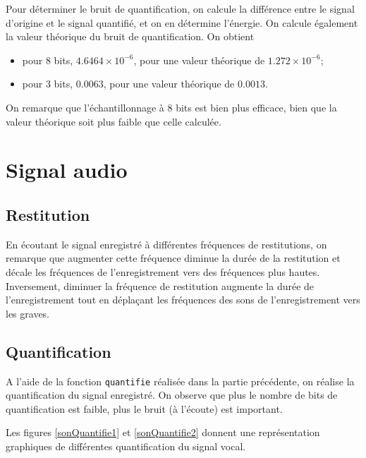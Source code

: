 \documentclass[french]{article}
\begin{document}

Pour déterminer le bruit de quantification, on calcule la différence entre le signal d'origine et le signal quantifié, et on en détermine l'énergie. On calcule également la valeur théorique du bruit de quantification. On obtient

\begin{itemize}
	\item pour 8 bits, $4.6464 \times 10^{-6}$, pour une valeur théorique de $1.272 \times 10^{-6}$;
	\item pour 3 bits, $0.0063$, pour une valeur théorique de $0.0013$.
\end{itemize}
On remarque que l'échantillonnage à 8 bits est bien plus efficace, bien que la valeur théorique soit plus faible que celle calculée.

\section{ Signal audio}

\subsection{ Restitution}

En écoutant le signal enregistré à différentes fréquences de restitutions, on remarque que augmenter cette fréquence diminue la durée de la restitution et décale les fréquences de l'enregistrement vers des fréquences plus hautes. Inversement, diminuer la fréquence de restitution augmente la durée de l'enregistrement tout en déplaçant les fréquences des sons de l'enregistrement vers les graves.

\subsection{ Quantification}

A l'aide de la fonction \verb`quantifie` réalisée dans la partie précédente, on réalise la quantification du signal enregistré. On observe que plus le nombre de bits de quantification est faible, plus le bruit (à l'écoute) est important.

Les figures \ref{sonQuantifie1} et \ref{sonQuantifie2} donnent une représentation graphiques de différentes quantification du signal vocal.
\end{document}
